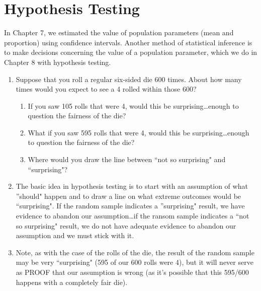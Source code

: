 \documentclass{article}
\begin{document}
\section*{Hypothesis Testing}

In Chapter 7, we estimated the value of population parameters (mean and proportion) using confidence intervals. Another method of statistical inference is to make decisions concerning the value of a population parameter, which we do in Chapter 8 with hypothesis testing.

\begin{enumerate}

  \item Suppose that you roll a regular six-sided die 600 times. About how many times would you expect to see a 4 rolled within those 600?
    
    \begin{enumerate}
    
      \item If you saw 105 rolls that were 4, would this be surprising\ldots enough to question the fairness of the die?

      \item What if you saw 595 rolls that were 4, would this be surprising\ldots enough to question the fairness of the die?

      \item Where would you draw the line between ``not so surprising" and ``surprising"?
      
    \end{enumerate}
    
  \item The basic idea in hypothesis testing is to start with an assumption of what ''should" happen and to draw a line on what extreme outcomes would be ``surprising". If the random sample indicates a ''surprising" result, we have evidence to abandon our assumption\ldots if the ransom sample indicates a ``not so surprising" result, we do not have adequate evidence to abandon our assumption and we must stick with it.
  
  \item Note, as with the case of the rolls of the die, the result of the random sample may be very ``surprising" (595 of our 600 rolls were 4), but it will never serve as PROOF that our assumption is wrong (as it's possible that this 595/600 happens with a completely fair die).
  
\end{enumerate}
\end{document}
